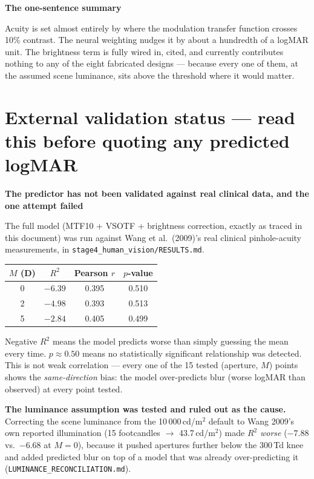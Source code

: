 \documentclass[11pt]{report}
\newenvironment{keybox}[1]%
{\par\vspace{6pt}\begin{lrbox}{\kbsave}\begin{minipage}{0.88\textwidth}%
{\bfseries\color{hbblue}#1}\par\vspace{4pt}\ignorespaces}%
{\end{minipage}\end{lrbox}%
\begin{center}\setlength{\fboxrule}{1.2pt}\setlength{\fboxsep}{7pt}%
\fcolorbox{hbblue}{boxgrey}{\usebox{\kbsave}}\end{center}\vspace{6pt}\par}
\newenvironment{warnbox}[1]%
{\par\vspace{6pt}\begin{lrbox}{\wbsave}\begin{minipage}{0.88\textwidth}%
{\bfseries\color{warnred}#1}\par\vspace{4pt}\ignorespaces}%
{\end{minipage}\end{lrbox}%
\begin{center}\setlength{\fboxrule}{1.2pt}\setlength{\fboxsep}{7pt}%
\fcolorbox{warnred}{white}{\usebox{\wbsave}}\end{center}\vspace{6pt}\par}
\begin{document}
\begin{keybox}{The one-sentence summary}
Acuity is set almost entirely by where the modulation transfer function crosses 10\% contrast. The
neural weighting nudges it by about a hundredth of a logMAR unit. The brightness term is fully wired
in, cited, and currently contributes nothing to any of the eight fabricated designs --- because
every one of them, at the assumed scene luminance, sits above the threshold where it would matter.
\end{keybox}

\chapter{External validation status --- read this before quoting any predicted logMAR}

\begin{warnbox}{The predictor has not been validated against real clinical data, and the one attempt failed}
The full model (MTF10 + VSOTF + brightness correction, exactly as traced in this document) was run
against Wang et al.\ (2009)'s real clinical pinhole-acuity measurements, in
\texttt{stage4\_human\_vision/RESULTS.md}.

\begin{center}
\begin{tabular}{cccc}
\toprule
$M$ (D) & $R^2$ & Pearson $r$ & $p$-value \\
\midrule
0 & $-6.39$ & 0.395 & 0.510 \\
2 & $-4.98$ & 0.393 & 0.513 \\
5 & $-2.84$ & 0.405 & 0.499 \\
\bottomrule
\end{tabular}
\end{center}

Negative $R^2$ means the model predicts worse than simply guessing the mean every time. $p\approx0.50$
means no statistically significant relationship was detected. This is not weak correlation --- every
one of the 15 tested (aperture, $M$) points shows the \emph{same-direction} bias: the model
over-predicts blur (worse logMAR than observed) at every point tested.
\end{warnbox}

\textbf{The luminance assumption was tested and ruled out as the cause.} Correcting the scene
luminance from the 10\,000\,cd/m$^2$ default to Wang 2009's own reported illumination
(15 footcandles $\to$ 43.7\,cd/m$^2$) made $R^2$ \emph{worse} ($-7.88$ vs.\ $-6.68$ at $M=0$), because
it pushed apertures further below the 300\,Td knee and added predicted blur on top of a model that was
already over-predicting it (\texttt{LUMINANCE\_RECONCILIATION.md}).
\end{document}
